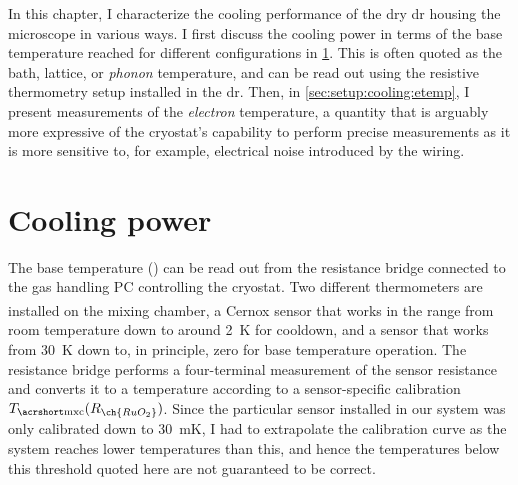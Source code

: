 In this chapter, I characterize the cooling performance of the dry \gls{dr} housing the microscope in various ways. %
I first discuss the cooling power in terms of the base temperature \Tmxc reached for different configurations in \cref{sec:setup:cooling:power}.
This is often quoted as the bath, lattice, or \emph{phonon} temperature,
and can be read out using the resistive  thermometry setup installed in the \gls{dr}.
Then, in \cref{sec:setup:cooling:etemp}, I present measurements of the \emph{electron} temperature, a quantity that is arguably more expressive of the cryostat's capability to perform precise measurements as it is more sensitive to, for example, electrical noise introduced by the wiring.

\section{Cooling power}\label{sec:setup:cooling:power}
The base temperature (\Tmxc) can be read out from the resistance bridge connected to the gas handling PC controlling the cryostat.
Two different thermometers are installed on the mixing chamber, a Cernox\textsuperscript{\textregistered} sensor that works in the range from room temperature down to around \qty{2}{\kelvin} for cooldown, and a  sensor that works from \qty{30}{\kelvin} down to, in principle, zero for base temperature operation.
The resistance bridge performs a four-terminal measurement of the sensor resistance and converts it to a temperature according to a sensor-specific calibration $\Tmxc(R_{\ch{RuO_2}})$.
Since the particular sensor installed in our system was only calibrated down to \qty{30}{\milli\kelvin}, I had to extrapolate the calibration curve as the system reaches lower temperatures than this, and hence the temperatures below this threshold quoted here are not guaranteed to be correct.

